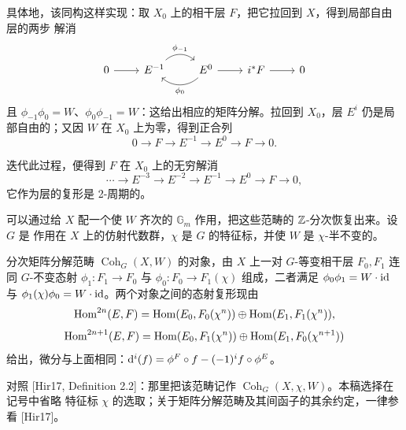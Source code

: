 
具体地，该同构这样实现：取 $X_0$ 上的相干层 $F$，把它拉回到 $X$，得到局部自由层的两步
解消
\[
\begin{tikzcd}[column sep=2.3em, row sep=small]
0 \arrow[r] & E^{-1} \arrow[r, bend left=42, "\phi_{-1}"]
  & E^{0} \arrow[l, bend left=42, "\phi_0"] \arrow[r] & i^*F \arrow[r] & 0
\end{tikzcd}
\]
且 $\phi_{-1}\phi_0=W$、$\phi_0\phi_{-1}=W$：这给出相应的矩阵分解。拉回到 $X_0$，层
$E^i$ 仍是局部自由的；又因 $W$ 在 $X_0$ 上为零，得到正合列
\[
0\to F\to E^{-1}\to E^0\to F\to 0.
\]


迭代此过程，便得到 $F$ 在 $X_0$ 上的无穷解消
\[
\cdots\to E^{-3}\to E^{-2}\to E^{-1}\to E^0\to F\to 0,
\]
它作为层的复形是 2-周期的。

可以通过给 $X$ 配一个使 $W$ 齐次的 $\mathbb G_m$ 作用，把这些范畴的 $\mathbb{Z}$-分次恢复出来。设 $G$ 是
作用在 $X$ 上的仿射代数群，$\chi$ 是 $G$ 的特征标，并使 $W$ 是 $\chi$-半不变的。

\begin{definition}\label{def:graded-mf}
分次矩阵分解范畴 $\operatorname{Coh}_G(X,W)$ 的对象，由 $X$ 上一对 $G$-等变相干层 $F_0,F_1$ 连同
$G$-不变态射 $\phi_1\colon F_1\to F_0$ 与 $\phi_0\colon F_0\to F_1(\chi)$ 组成，二者满足
$\phi_0\phi_1=W\cdot\mathrm{id}$ 与 $\phi_1(\chi)\phi_0=W\cdot\mathrm{id}$。两个对象之间的态射复形现由
\[
\operatorname{Hom}^{2n}(E,F)=\operatorname{Hom}(E_0,F_0(\chi^n))\oplus\operatorname{Hom}(E_1,F_1(\chi^n)),
\]
\[
\operatorname{Hom}^{2n+1}(E,F)=\operatorname{Hom}(E_0,F_1(\chi^n))\oplus\operatorname{Hom}(E_1,F_0(\chi^{n+1}))
\]
给出，微分与上面相同：$\mathrm{d}^i(f)=\phi^F\circ f-(-1)^if\circ\phi^E$。
\end{definition}


对照 [Hir17, Definition 2.2]：那里把该范畴记作 $\operatorname{Coh}_G(X,\chi,W)$。本稿选择在记号中省略
特征标 $\chi$ 的选取；关于矩阵分解范畴及其间函子的其余约定，一律参看 [Hir17]。

